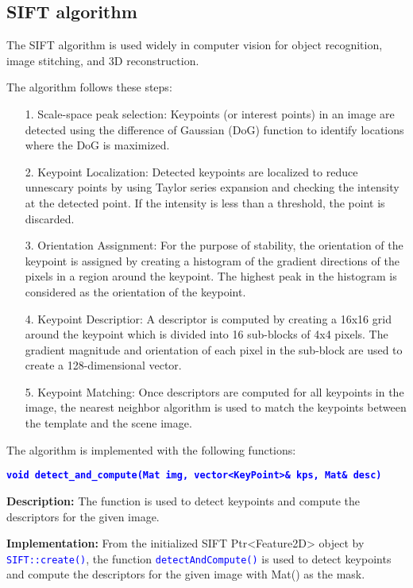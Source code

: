 \documentclass{report}
\begin{document}
\subsection*{SIFT algorithm}
The SIFT algorithm is used widely in computer vision for object recognition, image stitching, and 3D reconstruction.

The algorithm follows these steps:
\begin{itemize}
  \item[1.] Scale-space peak selection: Keypoints (or interest points) in an image are detected using the difference of Gaussian (DoG) function to identify locations where the DoG is maximized.
  \item[2.] Keypoint Localization: Detected keypoints are localized to reduce unnescary points by using Taylor series expansion and checking the intensity at the detected point. If the intensity is less than a threshold, the point is discarded.
  \item[3.]Orientation Assignment: For the purpose of stability, the orientation of the keypoint is assigned by creating a histogram of the gradient directions of the pixels in a region around the keypoint. The highest peak in the histogram is considered as the orientation of the keypoint.
  \item[4.] Keypoint Descriptior: A descriptor is computed by creating a 16x16 grid around the keypoint which is divided into 16 sub-blocks of 4x4 pixels. The gradient magnitude and orientation of each pixel in the sub-block are used to create a 128-dimensional vector.
  \item[5.] Keypoint Matching: Once descriptors are computed for all keypoints in the image, the nearest neighbor algorithm is used to match the keypoints between the template and the scene image.
\end{itemize}

The algorithm is implemented with the following functions:

\textbf{\textcolor{blue}{\lstinline|void detect_and_compute(Mat img, vector<KeyPoint>& kps, Mat& desc)|}}

\textbf{Description:} The function is used to detect keypoints and compute the descriptors for the given image.

\textbf{Implementation:} From the initialized SIFT Ptr<Feature2D> object by \textcolor{blue}{\lstinline|SIFT::create()|}, the function \textcolor{blue}{\lstinline|detectAndCompute()|} is used to detect keypoints and compute the descriptors for the given image with Mat() as the mask.
\end{document}
